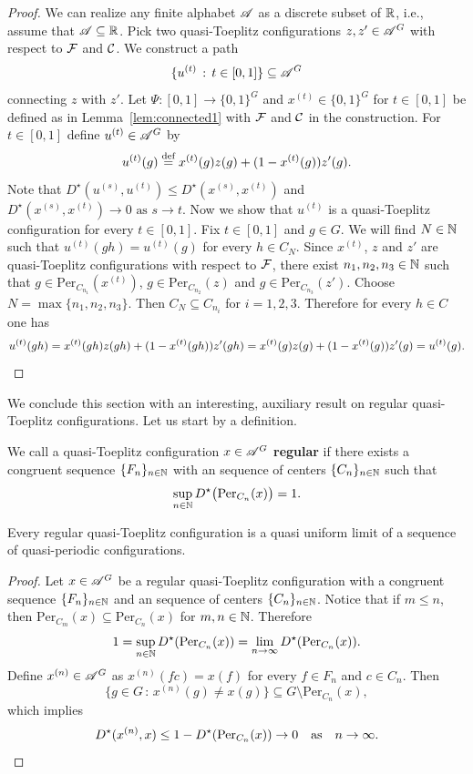 \begin{proof}
We can realize any finite alphabet $\mathscr{A}$ as a discrete subset of $\mathbb{R}$, i.e., assume that $\mathscr{A}\subseteq \mathbb R$.
%
Pick two quasi-Toeplitz configurations $z,z'\in \mathscr{A}^G$ with respect to $\operatorname{\mathcal{F}}$ and $\operatorname{\mathcal{C}}$. 
We construct a path 
\[
\{u^{(t)}\,:\,t\in[0,1]\}\subseteq \mathscr{A}^G
\]
connecting $z$ with $z'$.
%
Let $\Psi\colon[0,1]\to\{0,1\}^G$ and $ x^{(t)}\in\{0,1\}^G$ for $t\in[0,1]$ be defined as in Lemma~\ref{lem:connected1} with $\operatorname{\mathcal{F}}$ and $\operatorname{\mathcal{C}}$ in the construction. 
%
For $t\in[0,1]$ define $u^{(t)}\in\mathscr{A}^G$ by 
\[
{u}^{(t)}(g)\stackrel{\textup{def}}{=} x^{(t)}(g){z}(g)+(1-x^{(t)}(g)) {z}'(g).
\]
Note that  $D^\star(u^{(s)},u^{(t)})\leq D^\star(x^{(s)},x^{(t)})$ and $D^\star( x^{(s)}, x^{(t)})\to 0\text{ as }s\to t.$ Now we show that $u^{(t)}$ is a quasi-Toeplitz configuration for every $t\in[0,1]$. Fix $t\in[0,1]$ and $g\in G$. We will find $N\in\mathbb{N}$ such that ${u}^{(t)}(gh)={u}^{(t)}(g)$ for every $h\in C_N$. Since $x^{(t)}$, $z$ and $z'$ are quasi-Toeplitz configurations with respect to $\operatorname{\mathcal{F}}$, there exist $n_1,n_2,n_3\in\mathbb{N}$ such that $g\in\text{Per}_{C_{n_1}}(x^{(t)})$, $g\in  \text{Per}_{C_{n_2}}( z)$ and $g\in  \text{Per}_{C_{n_3}}(z')$.  Choose $N=\max\{n_1,n_2,n_3\}$. Then $C_N\subseteq C_{n_i}$ for $i=1,2,3$.
Therefore for every $h\in C$ one has 
\[
{u}^{(t)}(gh)=x^{(t)}(gh) {z}(gh) +(1-x^{(t)}(gh)) {z}'(gh)=x^{(t)}(g){z}(g)+(1-x^{(t)}(g)) {z}'(g)={u}^{(t)}(g). \qedhere
\]
\end{proof}

\noindent 
We conclude this section with an interesting, auxiliary result on regular quasi-Toeplitz configurations.
%
Let us start by a definition.
\begin{defn}
We call a quasi-Toeplitz configuration $x\in \mathscr{A}^G$ {\bf regular}
if there exists a congruent sequence $\{F_n\}_{n\in\mathbb{N}}$ with an \elegant sequence of centers $\{C_n\}_{n\in\mathbb{N}}$ such that
\[
\sup_{n\in\mathbb{N}} D^\star\big(\text{Per}_{C_n}( x)\big)=1.
\]
\end{defn}
\begin{lem}\label{sss}
Every regular quasi-Toeplitz configuration is a quasi uniform limit of a sequence of quasi-periodic configurations.
\end{lem}

\begin{proof}
Let $x\in\mathscr{A}^G$ be a regular quasi-Toeplitz configuration with a congruent sequence $\{F_n\}_{n\in\mathbb{N}}$ and an \elegant sequence of centers $\{C_n\}_{n\in\mathbb{N}}$.
Notice that if $m\leq n$, then $\text{Per}_{C_m}(x)\subseteq\text{Per}_{C_n}( x)$ for $m,n\in\mathbb{N}$.
Therefore 
\[
1=\sup_{n\in\mathbb{N}}D^\star(\text{Per}_{C_n}(x))=\lim\limits_{n\to\infty}D^\star(\text{Per}_{C_n}(x)).
\]
Define $x^{(n)}\in \mathscr{A}^G$ as $x^{(n)}(fc)= x(f)$ for every $f\in F_n$ and $c\in C_n$.  
Then 
\[
\{g\in G\,:\,x^{(n)}(g)\neq x(g)\}\subseteq G\setminus \text{Per}_{C_n}( x),
\]
which implies 
\[
D^\star( x^{(n)}, x)\leq 1- D^\star(\text{Per}_{C_n}( x))\to 0 \quad \text{as}\quad n\to\infty. \qedhere
\]
\end{proof}


